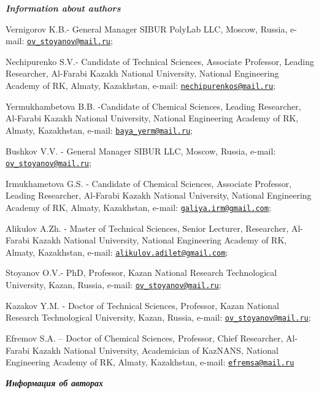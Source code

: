 \begin{authorinfo}
\hspace{1em}\emph{{\bfseries Information about authors}}

Vernigorov K.B.- General Manager SIBUR PolyLab LLC, Moscow, Russia,
e-mail:
\href{mailto:ov_stoyanov@mail.ru}{\nolinkurl{ov\_stoyanov@mail.ru}};

Nechipurenko S.V.- Candidate of Technical Sciences, Associate Professor,
Leading Researcher, Al-Farabi Kazakh National University, National
Engineering Academy of RK, Almaty, Kazakhstan, e-mail:
\href{mailto:nechipurenkos@mail.ru}{\nolinkurl{nechipurenkos@mail.ru}};

Yermukhambetova B.B. -Candidate of Chemical Sciences, Leading
Researcher, Al-Farabi Kazakh National University, National Engineering
Academy of RK, Almaty, Kazakhstan, e-mail:
\href{mailto:baya_yerm@mail.ru}{\nolinkurl{baya\_yerm@mail.ru}};

Bushkov V.V. - General Manager SIBUR LLC, Moscow, Russia, e-mail:
\href{mailto:ov_stoyanov@mail.ru}{\nolinkurl{ov\_stoyanov@mail.ru}};

Irmukhametova G.S. - Candidate of Chemical Sciences, Associate
Professor, Leading Researcher, Al-Farabi Kazakh National University,
National Engineering Academy of RK, Almaty, Kazakhstan, e-mail:
\href{mailto:galiya.irm@gmail.com}{\nolinkurl{galiya.irm@gmail.com}};

Alikulov A.Zh. - Master of Technical Sciences, Senior Lecturer,
Researcher, Al-Farabi Kazakh National University, National Engineering
Academy of RK, Almaty, Kazakhstan, e-mail:
\href{mailto:alikulov.adilet@gmail.com}{\nolinkurl{alikulov.adilet@gmail.com}};

Stoyanov O.V.- PhD, Professor, Kazan National Research Technological
University, Kazan, Russia, e-mail:
\href{mailto:ov_stoyanov@mail.ru}{\nolinkurl{ov\_stoyanov@mail.ru}};

Kazakov Y.M. - Doctor of Technical Sciences, Professor, Kazan National
Research Technological University, Kazan, Russia, e-mail:
\href{mailto:ov_stoyanov@mail.ru}{\nolinkurl{ov\_stoyanov@mail.ru}};

Efremov S.A. -- Doctor of Chemical Sciences, Professor, Chief
Researcher, Al-Farabi Kazakh National University, Academician of
KazNANS, National Engineering Academy of RK, Almaty, Kazakhstan, e-mail:
\href{mailto:efremsa@mail.ru}{\nolinkurl{efremsa@mail.ru}}

\hspace{1em}\emph{{\bfseries Информация об авторах}}


\end{authorinfo}
